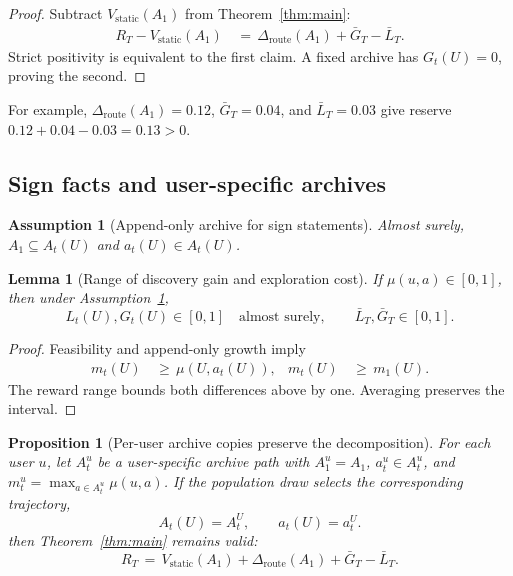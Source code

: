 \documentclass{article} %
\newtheorem{lemma}[theorem]{Lemma}
\newtheorem{proposition}[theorem]{Proposition}
\newtheorem{assumption}{Assumption}
\begin{document}
\begin{proof}
Subtract \(V_{\mathrm{static}}(A_1)\) from Theorem~\ref{thm:main}:
\begin{equation}
\begin{aligned}
R_T
-
V_{\mathrm{static}}(A_1)
&\,=\,
\Delta_{\mathrm{route}}(A_1)
+
\bar G_T
-
\bar L_T.
\end{aligned}
\end{equation}
Strict positivity is equivalent to the first claim.  A fixed archive has
\(G_t(U)=0\), proving the second.
\end{proof}

For example, \(\Delta_{\mathrm{route}}(A_1)=0.12\), \(\bar G_T=0.04\), and
\(\bar L_T=0.03\) give reserve \(0.12+0.04-0.03=0.13>0\).

\subsection{Sign facts and user-specific archives}

\begin{assumption}[Append-only archive for sign statements]
\label{assump:app-append-only}
Almost surely, \(A_1\subseteq A_t(U)\) and \(a_t(U)\in A_t(U)\).
\end{assumption}

\begin{lemma}[Range of discovery gain and exploration cost]
\label{lem:range-discovery-exploration}
If \(\mu(u,a)\in[0,1]\), then under
Assumption~\ref{assump:app-append-only},
\begin{equation}
L_t(U),G_t(U)\in[0,1]\quad\text{almost surely},
\qquad
\bar L_T,\bar G_T\in[0,1].
\end{equation}
\end{lemma}

\begin{proof}
Feasibility and append-only growth imply
\begin{equation}
\begin{aligned}
m_t(U)
&\,\geq\,\mu(U,a_t(U)), &
m_t(U)
&\,\geq\,m_1(U).
\end{aligned}
\end{equation}
The reward range bounds both differences above by one.  Averaging preserves
the interval.
\end{proof}

\begin{proposition}[Per-user archive copies preserve the decomposition]
\label{prop:5}
For each user \(u\), let \(A_t^u\) be a user-specific archive path with
\(A_1^u=A_1\), \(a_t^u\in A_t^u\), and
\(m_t^u=\max_{a\in A_t^u}\mu(u,a)\).  If the population draw selects the
corresponding trajectory,
\begin{equation}
A_t(U)=A_t^U,
\qquad
a_t(U)=a_t^U.
\end{equation}
then Theorem~\ref{thm:main} remains valid:
\begin{equation}
R_T
\,=\,
V_{\mathrm{static}}(A_1)
+
\Delta_{\mathrm{route}}(A_1)
+
\bar G_T
-
\bar L_T.
\end{equation}
\end{proposition}
\end{document}
